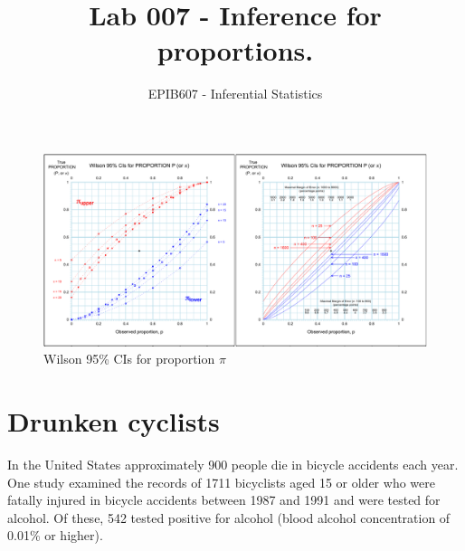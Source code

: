 \documentclass[letterpaper,11pt,twoside,]{pinp}
\title{Lab 007 - Inference for proportions.}
\author[a]{EPIB607 - Inferential Statistics}
\affil[a]{McGill University}
\begin{document}
\verticaladjustment{-2pt}

\maketitle
\thispagestyle{firststyle}



\begin{figure}[H]
  \begin{center}
\includegraphics[scale=0.65]{Nomogram.pdf}
  \end{center}
  \caption{\normalsize Wilson 95\% CIs for proportion $\pi$}\label{fig:nomo}
\end{figure}

\hypertarget{drunken-cyclists}{%
\section{Drunken cyclists}\label{drunken-cyclists}}

In the United States approximately 900 people die in bicycle accidents
each year. One study examined the records of 1711 bicyclists aged 15 or
older who were fatally injured in bicycle accidents between 1987 and
1991 and were tested for alcohol. Of these, 542 tested positive for
alcohol (blood alcohol concentration of 0.01\% or higher).
\end{document}
